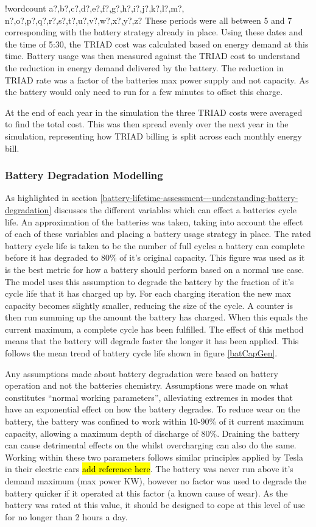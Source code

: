 \documentclass[fontsize=9.5pt]{extarticle}
\numberwithin{figure}{section} %
\newcounter{words}
\newenvironment{counted}{%
  \setcounter{words}{0}
  \SearchList!{wordcount}{\stepcounter{words}}
    {a?,b?,c?,d?,e?,f?,g?,h?,i?,j?,k?,l?,m?,
    n?,o?,p?,q?,r?,s?,t?,u?,v?,w?,x?,y?,z?}
  \UndoBoundary{'}
  \SearchOrder{p;}}{%
  \StopSearching}
\begin{document}
\begin{counted}
These periods were all between 5 and 7 corresponding with the battery
strategy already in place. Using these dates and the time of 5:30, the
TRIAD cost was calculated based on energy demand at this time. Battery
usage was then measured against the TRIAD cost to understand the
reduction in energy demand delivered by the battery. The reduction in
TRIAD rate was a factor of the batteries max power supply and not
capacity. As the battery would only need to run for a few minutes to
offset this charge.

At the end of each year in the simulation the three TRIAD costs were
averaged to find the total cost. This was then spread evenly over the
next year in the simulation, representing how TRIAD billing is split
across each monthly energy bill.

\subsubsection{Battery Degradation
Modelling}\label{battery-degradation-modelling}

As highlighted in section
\ref{battery-lifetime-assessment---understanding-battery-degradation}
discusses the different variables which can effect a batteries cycle
life. An approximation of the batteries was taken, taking into account
the effect of each of these variables and placing a battery usage
strategy in place. The rated battery cycle life is taken to be the
number of full cycles a battery can complete before it has degraded to
80\% of it's original capacity. This figure was used as it is the best
metric for how a battery should perform based on a normal use case. The
model uses this assumption to degrade the battery by the fraction of
it's cycle life that it has charged up by. For each charging iteration
the new max capacity becomes slightly smaller, reducing the size of the
cycle. A counter is then run summing up the amount the battery has
charged. When this equals the current maximum, a complete cycle has been
fulfilled. The effect of this method means that the battery will degrade
faster the longer it has been applied. This follows the mean trend of
battery cycle life shown in figure \ref{batCapGen}.

Any assumptions made about battery degradation were based on battery
operation and not the batteries chemistry. Assumptions were made on what
constitutes ``normal working parameters'', alleviating extremes in modes
that have an exponential effect on how the battery degrades. To reduce
wear on the battery, the battery was confined to work within 10-90\% of
it current maximum capacity, allowing a maximum depth of discharge of
80\%. Draining the battery can cause detrimental effects on the whilst
overcharging can also do the same. Working within these two parameters
follows similar principles applied by Tesla in their electric cars
\hl{add reference here}. The battery was never run above it's demand
maximum (max power KW), however no factor was used to degrade the
battery quicker if it operated at this factor (a known cause of wear).
As the battery was rated at this value, it should be designed to cope at
this level of use for no longer than 2 hours a day.


\end{counted}
\end{document}
